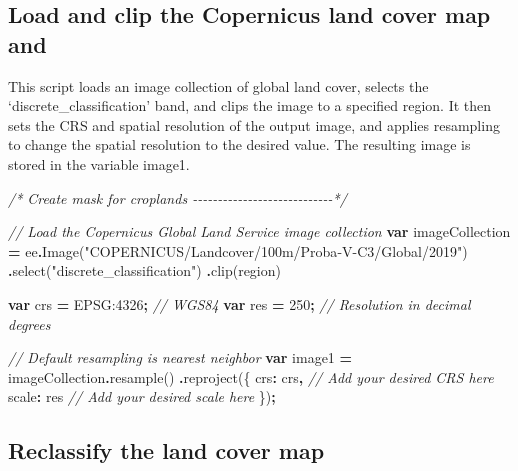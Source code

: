 \documentclass[
  10pt,
  b5paper,
  oneside]{book}
\newenvironment{Shaded}{\begin{snugshade}}{\end{snugshade}}
\newcommand{\CommentTok}[1]{\textcolor[rgb]{0.56,0.35,0.01}{\textit{#1}}}
\newcommand{\DataTypeTok}[1]{\textcolor[rgb]{0.13,0.29,0.53}{#1}}
\newcommand{\DecValTok}[1]{\textcolor[rgb]{0.00,0.00,0.81}{#1}}
\newcommand{\FunctionTok}[1]{\textcolor[rgb]{0.00,0.00,0.00}{#1}}
\newcommand{\KeywordTok}[1]{\textcolor[rgb]{0.13,0.29,0.53}{\textbf{#1}}}
\newcommand{\NormalTok}[1]{#1}
\newcommand{\OperatorTok}[1]{\textcolor[rgb]{0.81,0.36,0.00}{\textbf{#1}}}
\newcommand{\StringTok}[1]{\textcolor[rgb]{0.31,0.60,0.02}{#1}}
\begin{document}
\hypertarget{load-and-clip-the-copernicus-land-cover-map-and}{%
\subsection{Load and clip the Copernicus land cover map and}\label{load-and-clip-the-copernicus-land-cover-map-and}}

This script loads an image collection of global land cover, selects the `discrete\_classification' band, and clips the image to a specified region. It then sets the CRS and spatial resolution of the output image, and applies resampling to change the spatial resolution to the desired value. The resulting image is stored in the variable image1.

\begin{Shaded}
\begin{Highlighting}[]
\CommentTok{/* Create mask for croplands {-}{-}{-}{-}{-}{-}{-}{-}{-}{-}{-}{-}{-}{-}{-}{-}{-}{-}{-}{-}{-}{-}{-}{-}{-}{-}{-}{-}*/}

\CommentTok{// Load the Copernicus Global Land Service image collection}
\KeywordTok{var}\NormalTok{ imageCollection }\OperatorTok{=}\NormalTok{ ee}\OperatorTok{.}\FunctionTok{Image}\NormalTok{(}\StringTok{"COPERNICUS/Landcover/100m/Proba{-}V{-}C3/Global/2019"}\NormalTok{)}
  \OperatorTok{.}\FunctionTok{select}\NormalTok{(}\StringTok{"discrete\_classification"}\NormalTok{)}
  \OperatorTok{.}\FunctionTok{clip}\NormalTok{(region)}

\KeywordTok{var}\NormalTok{ crs }\OperatorTok{=} \StringTok{\textquotesingle{}EPSG:4326\textquotesingle{}}\OperatorTok{;} \CommentTok{// WGS84}
\KeywordTok{var}\NormalTok{ res }\OperatorTok{=} \DecValTok{250}\OperatorTok{;} \CommentTok{// Resolution in decimal degrees}

\CommentTok{// Default resampling is nearest neighbor}
\KeywordTok{var}\NormalTok{ image1 }\OperatorTok{=}\NormalTok{ imageCollection}\OperatorTok{.}\FunctionTok{resample}\NormalTok{()}
  \OperatorTok{.}\FunctionTok{reproject}\NormalTok{(\{}
    \DataTypeTok{crs}\OperatorTok{:}\NormalTok{ crs}\OperatorTok{,} \CommentTok{// Add your desired CRS here}
    \DataTypeTok{scale}\OperatorTok{:}\NormalTok{ res }\CommentTok{// Add your desired scale here}
\NormalTok{  \})}\OperatorTok{;}
\end{Highlighting}
\end{Shaded}

\hypertarget{reclassify-the-land-cover-map}{%
\subsection{Reclassify the land cover map}\label{reclassify-the-land-cover-map}}
\end{document}
